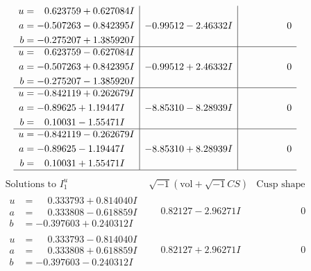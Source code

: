\documentclass[1p]{elsarticle_modified}
\theoremstyle{definition}
\newcommand{\I}{\sqrt{-1}}
\begin{document}
$$\begin{array}{c|c|c}
\begin{aligned}
u &= \phantom{-}0.623759 + 0.627084 I \\
a &= -0.507263 - 0.842395 I \\
b &= -0.275207 + 1.385920 I\end{aligned}
 & -0.99512 - 2.46332 I & \phantom{-0.000000 } 0 \\ \hline\begin{aligned}
u &= \phantom{-}0.623759 - 0.627084 I \\
a &= -0.507263 + 0.842395 I \\
b &= -0.275207 - 1.385920 I\end{aligned}
 & -0.99512 + 2.46332 I & \phantom{-0.000000 } 0 \\ \hline\begin{aligned}
u &= -0.842119 + 0.262679 I \\
a &= -0.89625 + 1.19447 I \\
b &= \phantom{-}0.10031 - 1.55471 I\end{aligned}
 & -8.85310 - 8.28939 I & \phantom{-0.000000 } 0 \\ \hline\begin{aligned}
u &= -0.842119 - 0.262679 I \\
a &= -0.89625 - 1.19447 I \\
b &= \phantom{-}0.10031 + 1.55471 I\end{aligned}
 & -8.85310 + 8.28939 I & \phantom{-0.000000 } 0\\
 \hline 
 \end{array}$$\newpage$$\begin{array}{c|c|c}  
\text{Solutions to }I^u_{1}& \I (\text{vol} + \sqrt{-1}CS) & \text{Cusp shape}\\
 \hline 
\begin{aligned}
u &= \phantom{-}0.333793 + 0.814040 I \\
a &= \phantom{-}0.333808 - 0.618859 I \\
b &= -0.397603 + 0.240312 I\end{aligned}
 & \phantom{-}0.82127 - 2.96271 I & \phantom{-0.000000 } 0 \\ \hline\begin{aligned}
u &= \phantom{-}0.333793 - 0.814040 I \\
a &= \phantom{-}0.333808 + 0.618859 I \\
b &= -0.397603 - 0.240312 I\end{aligned}
 & \phantom{-}0.82127 + 2.96271 I & \phantom{-0.000000 } 0 \\ \hline\begin{aligned}

\end{aligned}
\end{array}$$
\end{document}
